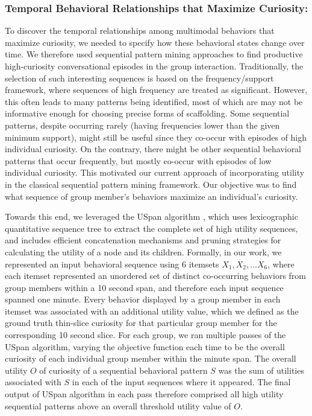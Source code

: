 \documentclass{llncs}
\begin{document}
\subsubsection{Temporal Behavioral Relationships that Maximize Curiosity:}
\vspace{-0.2cm}
To discover the temporal relationships among multimodal behaviors that maximize curiosity, we needed to specify how these behavioral states change over time. We therefore used sequential pattern mining approaches to find productive high-curiosity conversational episodes in the group interaction. Traditionally, the selection of such interesting sequences is based on the frequency/support framework, where sequences of high frequency are treated as significant. However, this often leads to  many patterns being identified, most of which are may not be informative enough for choosing precise forms of scaffolding. Some sequential patterns, despite occurring rarely (having frequencies lower than the given minimum support), might still be useful since they co-occur with episodes of high individual curiosity. On the contrary, there might be other sequential behavioral patterns that occur frequently, but mostly co-occur with episodes of low individual curiosity. This motivated our current approach of incorporating utility in the classical sequential pattern mining framework. Our objective was to find what sequence of group member's behaviors maximize an individual's curiosity. 

Towards this end, we leveraged the USpan algorithm \cite{yin2012uspan}, which uses lexicographic quantitative sequence tree to extract the complete set of high utility sequences, and includes efficient concatenation mechanisms and pruning strategies for calculating the utility of a node and its children. Formally, in our work, we represented an input behavioral sequence using 6 itemsets $X_1, X_2, ... X_6$, where each itemset represented an unordered set of distinct co-occurring behaviors from group members within a 10 second span, and therefore each input sequence spanned one minute. Every behavior displayed by a group member in each itemset was associated with an additional utility value, which we defined as the ground truth thin-slice curiosity for that particular group member for the corresponding 10 second slice. For each group, we ran multiple passes of the USpan algorithm, varying the objective function each time to be the overall curiosity of each individual group member within the minute span. The overall utility $O$ of curiosity of a sequential behavioral pattern $S$ was the sum of utilities associated with $S$ in each of the input sequences where it appeared. The final output of USpan algorithm in each pass therefore comprised all high utility sequential patterns above an overall threshold utility value of $O$. 
\vspace{-0.26cm}
\end{document}
